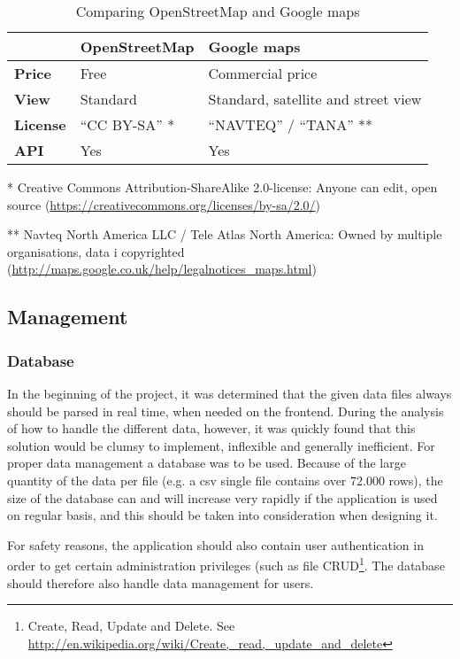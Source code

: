 \begin{table}[htbp]
\centering
\begin{tabular}{| l | l | l |}
\hline
& \textbf{OpenStreetMap} & \textbf{Google maps} \\
\hline
\textbf{Price} & Free & Commercial price \\
\hline
\textbf{View} & Standard & Standard, satellite and street view \\
\hline
\textbf{License} & ``CC BY-SA'' * & ``NAVTEQ'' / ``TANA'' ** \\
\hline
\textbf{API} & Yes & Yes \\
\hline
\end{tabular}
\caption{Comparing OpenStreetMap and Google maps}
\label{tab:osm_vs_google}
\end{table}
* Creative Commons Attribution-ShareAlike 2.0-license: Anyone can edit, open source (\url{https://creativecommons.org/licenses/by-sa/2.0/})

** Navteq North America LLC / Tele Atlas North America: Owned by multiple organisations, data i copyrighted (\url{http://maps.google.co.uk/help/legalnotices_maps.html})

\subsection{Management}
\label{sec:management}

\subsubsection{Database}
\label{sec:database}
In the beginning of the project, it was determined that the given data files always should be parsed in real time, when needed on the frontend. During the analysis of how to handle the different data, however, it was quickly found that this solution would be clumsy to implement, inflexible and generally inefficient.
For proper data management a database was to be used. Because of the large quantity of the data per file (e.g. a csv single file contains over 72.000 rows), the size of the database can and will increase very rapidly if the application is used on regular basis, and this should be taken into consideration when designing it.

For safety reasons, the application should also contain user authentication in order to get certain administration privileges (such as file CRUD\footnote{Create, Read, Update and Delete. See \url{http://en.wikipedia.org/wiki/Create,_read,_update_and_delete}}. The database should therefore also handle data management for users.

